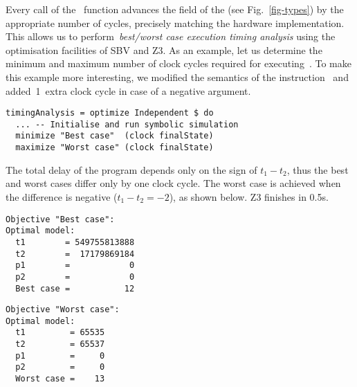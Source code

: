 
Every call of the~ function advances the  field
of the  (see Fig.~\ref{fig-types}) by the appropriate number of
cycles, precisely matching the hardware implementation. This allows us to
perform~\emph{best/worst case execution timing analysis} using the
optimisation facilities of SBV and Z3. As an example,
let us determine the minimum and maximum number of clock cycles required for
executing~. To make this example more
interesting, we modified the semantics of the instruction~ and
added~1~extra clock cycle in case of a negative argument.


\begin{verbatim}
timingAnalysis = optimize Independent $ do
  ... -- Initialise and run symbolic simulation
  minimize "Best case"  (clock finalState)
  maximize "Worst case" (clock finalState)
\end{verbatim}

\noindent
The total delay of the program depends only on the sign of $t_1 - t_2$, thus
the best and worst cases differ only by one clock cycle. The worst case is
achieved when the difference is negative ($t_1 - t_2 = -2$), as shown below.
Z3 finishes in 0.5s.

\noindent
\begin{minipage}{0.53\linewidth}
\begin{verbatim}
Objective "Best case":
Optimal model:
  t1        = 549755813888
  t2        =  17179869184
  p1        =            0
  p2        =            0
  Best case =           12
\end{verbatim}
\end{minipage}
\begin{minipage}{0.46\linewidth}
\begin{verbatim}
Objective "Worst case":
Optimal model:
  t1         = 65535
  t2         = 65537
  p1         =     0
  p2         =     0
  Worst case =    13
\end{verbatim}
\end{minipage}

